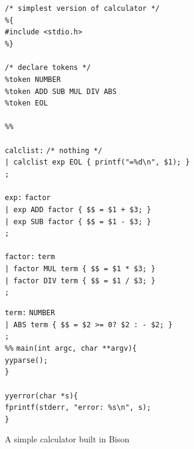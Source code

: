 \documentclass[12pt]{report}
\begin{document}
\begin{figure}[H]
	\begin{tabbing}
	\texttt{/* simplest version of calculator */}\\
	\texttt{\%\{}\\
	\texttt{\#include <stdio.h>}\\
	\texttt{\%\}}\\
	\\
	\texttt{/* declare tokens */}\\
	\texttt{\%token NUMBER}\\
	\texttt{\%token ADD SUB MUL DIV ABS}\\
	\texttt{\%token EOL}\\
	\\
	\texttt{\%\%}\\
	\\
	\texttt{calclist:} \= \texttt{/* nothing */}\\
	\> \texttt{| calclist exp EOL \{ printf("=\%d\textbackslash n", \$1); \}}\\
	\> \texttt{;}\\
	\\
	\texttt{exp:} \= \texttt{factor}\\
	\> \texttt{| exp ADD factor \{ \$\$ = \$1 + \$3; \}}\\
	\> \texttt{| exp SUB factor \{ \$\$ = \$1 - \$3; \}}\\
	\> \texttt{;}\\
	\\
	\texttt{factor:} \= \texttt{term}\\
	\> \texttt{| factor MUL term \{ \$\$ = \$1 * \$3; \}}\\
	\> \texttt{| factor DIV term \{ \$\$ = \$1 / \$3; \}}\\
	\> \texttt{;}
	\end{tabbing}
	\end{figure}
	\begin{figure}[H]
	\begin{tabbing}
	\ContinuedFloat
	\texttt{term:} \= \texttt{NUMBER}\\
	\> \texttt{| ABS term \{ \$\$ = \$2 >= 0? \$2 : - \$2; \}}\\
	\> \texttt{;}\\
	\texttt{\%\%}
	\texttt{main}\=\texttt{(int argc, char **argv)\{}\\
	\> \texttt{yyparse();}\\
	\texttt{\}}\\
	\\
	\texttt{yyerror(char *s)\{}\\
	\> \texttt{fprintf(stderr, "error: \%s\textbackslash n", s);}\\
	\texttt{\}}
	\end{tabbing}
	\caption{A simple calculator built in Bison}\label{fig:bison_example}
\end{figure}
\end{document}
